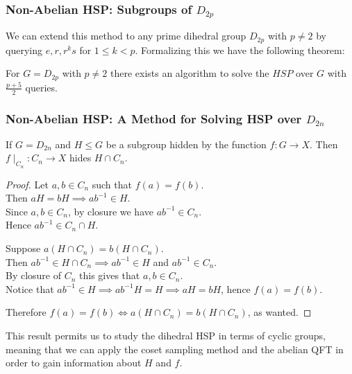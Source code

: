 \documentclass{beamer}
\begin{document}
\begin{frame}
\frametitle{Non-Abelian HSP: Subgroups of $D_{2p}$}
        We can extend this method to any prime dihedral group $D_{2p}$ with $p \neq 2$ by querying $e, r, r^k s$ for $1 \leq k < p$.
        Formalizing this we have the following theorem:

        \begin{theorem}
            For $G = D_{2p}$ with $p \neq 2$ there exists an algorithm to solve the $HSP$ over $G$ with $\frac{p+5}{2}$ queries.
        \end{theorem}
\end{frame}

\begin{frame}
\frametitle{Non-Abelian HSP: A Method for Solving HSP over $D_{2n}$}
        \begin{theorem}
            If $G = D_{2n}$ and $H \leqslant G$ be a subgroup hidden by the function $f : G \to X$. Then $f\mid_{C_n} : C_n \to X$ hides $H \cap C_n$.
        \end{theorem}
        \begin{proof}
            Let $a, b \in C_n$ such that $f(a) = f(b)$.\\
            Then $aH = bH \implies ab^{-1} \in H$.\\
            Since $a, b \in C_n$, by closure we have $ab^{-1} \in C_n$.\\
            Hence $ab^{-1} \in C_n \cap H$.

            Suppose $a(H \cap C_n) = b(H \cap C_n)$.\\
            Then $ab^{-1} \in H \cap C_n \implies ab^{-1} \in H$ and $ab^{-1} \in C_n$.\\
            By closure of $C_n$ this gives that $a, b \in C_n$.\\
            Notice that $ab^{-1} \in H \implies ab^{-1}H = H \implies aH = bH$, hence $f(a) = f(b)$.

            Therefore $f(a) = f(b) \iff a(H \cap C_n) = b(H \cap C_n)$, as wanted.
        \end{proof}

        This result permits us to study the dihedral HSP in terms of cyclic groups, meaning that we can apply the coset sampling method and the abelian QFT in order to gain information about $H$ and $f$.
\end{frame}

\newpage
\nocite{*}
\printbibliography
\end{document}
